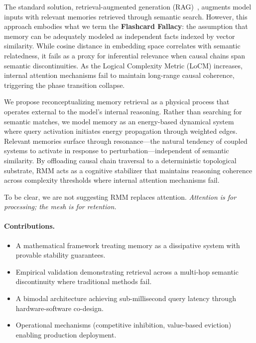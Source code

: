 \documentclass[11pt]{article}
\begin{document}
The standard solution, retrieval-augmented generation
(RAG)~\cite{lewis2020rag}, augments model inputs with relevant memories
retrieved through semantic search. However, this approach embodies what
we term the \textbf{Flashcard Fallacy}: the assumption that memory can
be adequately modeled as independent facts indexed by vector similarity.
While cosine distance in embedding space correlates with semantic
relatedness, it fails as a proxy for inferential relevance when causal
chains span semantic discontinuities. As the Logical Complexity Metric
(LoCM) increases, internal attention mechanisms fail to maintain
long-range causal coherence, triggering the phase transition collapse.

We propose reconceptualizing memory retrieval as a physical process that
operates external to the model's internal reasoning. Rather than
searching for semantic matches, we model memory as an energy-based
dynamical system~\cite{hopfield1982} where query activation initiates
energy propagation through weighted edges. Relevant memories surface
through resonance---the natural tendency of coupled systems to activate
in response to perturbation---independent of semantic similarity. By
offloading causal chain traversal to a deterministic topological
substrate, RMM acts as a cognitive stabilizer that maintains reasoning
coherence across complexity thresholds where internal attention
mechanisms fail.

To be clear, we are not suggesting RMM replaces attention.
\textit{Attention is for processing; the mesh is for retention.}

\paragraph{Contributions.}
\begin{itemize}
  \item A mathematical framework treating memory as a dissipative system
        with provable stability guarantees.
  \item Empirical validation demonstrating retrieval across a multi-hop
        semantic discontinuity where traditional methods fail.
  \item A bimodal architecture achieving sub-millisecond query latency
        through hardware-software co-design.
  \item Operational mechanisms (competitive inhibition, value-based
        eviction) enabling production deployment.
\end{itemize}
\end{document}
